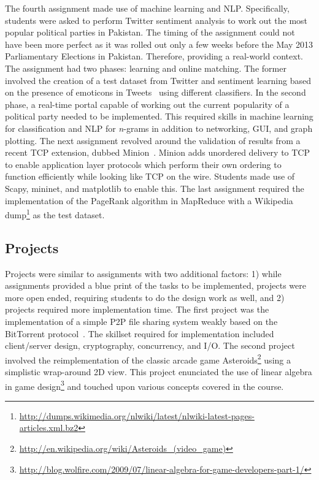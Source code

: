 \documentclass[letterpaper,twocolumn,10pt]{article}
\begin{document}
The fourth assignment made use of machine learning and NLP. Specifically,
students were asked to perform Twitter sentiment analysis to work out the most
popular political parties in Pakistan. The timing of the assignment could not
have been more perfect as it was rolled out only a few weeks before the May 2013
Parliamentary Elections in Pakistan. Therefore, providing a real-world context.
The assignment had two phases: learning and online matching. The former involved
the creation of a test dataset from Twitter and sentiment learning based on the
presence of emoticons in Tweets~\cite{Alec:2009:TSC} using different
classifiers. In the second phase, a real-time portal capable of working out the
current popularity of a political party needed to be implemented. This required
skills in machine learning for classification and NLP for \emph{n}-grams in
addition to networking, GUI, and graph plotting. The next assignment revolved
around the validation of results from a recent TCP extension, dubbed
Minion~\cite{Nowlan:2012:FSP}. Minion adds unordered delivery to TCP to enable
application layer protocols which perform their own ordering to function
efficiently while looking like TCP on the wire. Students made use of Scapy,
mininet, and matplotlib to enable this. The last assignment required the
implementation of the PageRank algorithm in MapReduce with a Wikipedia
dump\footnote{\url{http://dumps.wikimedia.org/nlwiki/latest/nlwiki-latest-pages-articles.xml.bz2}}
as the test dataset.

\subsection{Projects}
Projects were similar to assignments with two additional factors: 1) while
assignments provided a blue print of the tasks to be implemented, projects were
more open ended, requiring students to do the design work as well, and 2)
projects required more implementation time. The first project was the
implementation of a simple P2P file sharing system weakly based on the
BitTorrent protocol~\cite{Pouwelse:2005:BPF}. The skillset required for
implementation included client/server design, cryptography, concurrency, and
I/O. The second project involved the reimplementation of the classic arcade game
Asteroids\footnote{\url{http://en.wikipedia.org/wiki/Asteroids_(video_game)}}
using a simplistic wrap-around 2D view. This project enunciated the use of
linear algebra in game
design\footnote{\url{http://blog.wolfire.com/2009/07/linear-algebra-for-game-developers-part-1/}}
and touched upon various concepts covered in the course.
\end{document}
